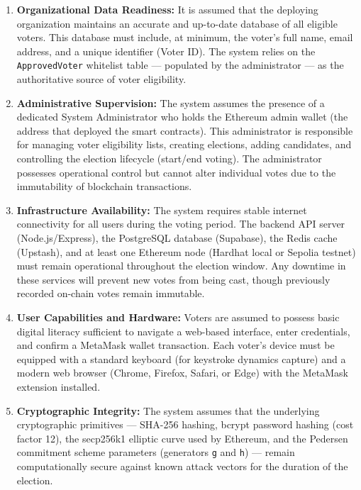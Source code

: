 \documentclass[oneside,a4paper,12pt]{book}
\begin{document}
\begin{enumerate}[leftmargin=1.5cm]
    \item \textbf{Organizational Data Readiness:} It is assumed that the deploying organization maintains an accurate and up-to-date database of all eligible voters. This database must include, at minimum, the voter's full name, email address, and a unique identifier (Voter ID). The system relies on the \texttt{ApprovedVoter} whitelist table --- populated by the administrator --- as the authoritative source of voter eligibility.

    \item \textbf{Administrative Supervision:} The system assumes the presence of a dedicated System Administrator who holds the Ethereum admin wallet (the address that deployed the smart contracts). This administrator is responsible for managing voter eligibility lists, creating elections, adding candidates, and controlling the election lifecycle (start/end voting). The administrator possesses operational control but cannot alter individual votes due to the immutability of blockchain transactions.

    \item \textbf{Infrastructure Availability:} The system requires stable internet connectivity for all users during the voting period. The backend API server (Node.js/Express), the PostgreSQL database (Supabase), the Redis cache (Upstash), and at least one Ethereum node (Hardhat local or Sepolia testnet) must remain operational throughout the election window. Any downtime in these services will prevent new votes from being cast, though previously recorded on-chain votes remain immutable.

    \item \textbf{User Capabilities and Hardware:} Voters are assumed to possess basic digital literacy sufficient to navigate a web-based interface, enter credentials, and confirm a MetaMask wallet transaction. Each voter's device must be equipped with a standard keyboard (for keystroke dynamics capture) and a modern web browser (Chrome, Firefox, Safari, or Edge) with the MetaMask extension installed.

    \item \textbf{Cryptographic Integrity:} The system assumes that the underlying cryptographic primitives --- SHA-256 hashing, bcrypt password hashing (cost factor 12), the secp256k1 elliptic curve used by Ethereum, and the Pedersen commitment scheme parameters (generators \texttt{g} and \texttt{h}) --- remain computationally secure against known attack vectors for the duration of the election.


\end{enumerate}
\end{document}
